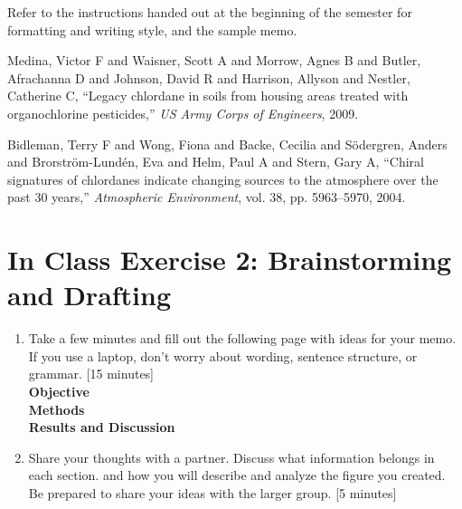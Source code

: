 \documentclass[12pt,letterpaper]{article}
\begin{document}
Refer to the instructions handed out at the beginning of the semester for  formatting and writing style, and the sample memo.\\




\begin{thebibliography}{9}



Medina, Victor F and Waisner, Scott A and Morrow, Agnes B and Butler, Afrachanna D and Johnson, David R and Harrison, Allyson and Nestler, Catherine C,
``Legacy chlordane in soils from housing areas treated with organochlorine pesticides,''
\emph{US Army Corps of Engineers}, 2009.


Bidleman, Terry F and Wong, Fiona and Backe, Cecilia and S{\"o}dergren, Anders and Brorstr{\"o}m-Lund{\'e}n, Eva and Helm, Paul A and Stern, Gary A,
``Chiral signatures of chlordanes indicate changing sources to the atmosphere over the past 30 years,''
\emph{Atmospheric Environment}, vol. 38, pp. 5963--5970, 2004.

 

\end{thebibliography}
\pagebreak
\section *{In Class Exercise 2: Brainstorming and Drafting}
\begin{enumerate}
\item Take a few minutes and fill out the following page with ideas for your memo.  If you use a laptop, don't worry about wording, sentence structure, or grammar. [15 minutes]\\ 

\textbf{Objective}\\

\textbf{Methods}\\

\textbf{Results and Discussion}\\

\item Share your thoughts with a partner.  Discuss what information belongs in each section. and how you will describe and analyze the figure you created.  Be prepared to share your ideas with the larger group. [5 minutes]
\end{enumerate}
\end{document}
